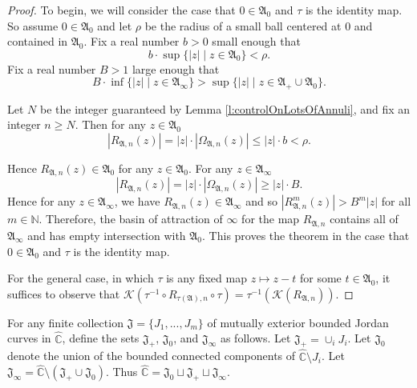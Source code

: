 \documentclass[a4paper,11pt,onecolumn]{amsart}
\theoremstyle{definition}
\begin{document}
  \begin{proof}
  To begin, we will consider the case that $0 \in \mathfrak{A}_0$ and $\tau$ is the identity map.  So assume $0 \in \mathfrak{A}_0$ and let $\rho$ be the radius of a small ball centered at $0$ and contained in $\mathfrak{A}_0$.  Fix a real number $b > 0$ small enough that 
  $$b \cdot \sup \{|z| \mid z \in \mathfrak{A}_0\} < \rho.$$  Fix a real number $B > 1$ large enough that 
  $$B \cdot \inf \{|z| \mid z \in \mathfrak{A}_{\infty}\} > \sup\{|z| \mid z \in \mathfrak{A}_+ \cup \mathfrak{A}_0\}.$$
  
  Let $N$ be the integer guaranteed by Lemma \ref{l:controlOnLotsOfAnnuli}, and fix an integer $n \geq N$.  Then for any $z \in \mathfrak{A}_0$
  $$|R_{\mathfrak{A},n}(z)| = |z| \cdot | \Omega_{\mathfrak{A},n}(z)| \leq |z| \cdot b < \rho.$$
  
  
    Hence $R_{\mathfrak{A},n}(z) \in \mathfrak{A}_0$ for any $z \in \mathfrak{A}_0$. 
  For any $z \in \mathfrak{A}_{\infty}$ 
  $$ |R_{\mathfrak{A},n}(z)| = |z| \cdot |\Omega_{\mathfrak{A},n}(z)| \geq |z| \cdot B.$$  Hence for any $z \in \mathfrak{A}_{\infty}$, we have $R_{\mathfrak{A},n}(z) \in \mathfrak{A}_{\infty}$ and so $|R^m_{\mathfrak{A},n}(z) | > B^m |z|$ for all $m \in \mathbb{N}$. 
  Therefore, the basin of attraction of $\infty$ for the map $R_{\mathfrak{A},n}$ contains all of $\mathfrak{A}_{\infty}$ and has empty intersection with $\mathfrak{A}_0$.  This proves the theorem in the case that $0 \in \mathfrak{A}_0$ and $\tau$ is the identity map. 
  
  For the general case, in which $\tau$ is any fixed map $z \mapsto z-t$ for some $t \in \mathfrak{A}_0$, it suffices to observe that $\mathcal{K}(\tau^{-1} \circ R_{\tau(\mathfrak{A}),n} \circ \tau) = \tau^{-1}(\mathcal{K}(R_{\mathfrak{A},n}))$.
  \end{proof}
  
  For any finite collection $\mathfrak{J}=\{J_1,...,J_m\}$ of mutually exterior bounded Jordan curves in $\hat{\mathbb{C}}$, define the sets $\mathfrak{J}_+$, $\mathfrak{J}_0$, and $\mathfrak{J}_{\infty}$ as follows.  Let $\mathfrak{J}_+ = \cup_i J_i$.  Let $\mathfrak{J}_0$ denote the union of the bounded connected components of $\hat{\mathbb{C}}\setminus J_i$.  Let $\mathfrak{J}_{\infty} = \hat{\mathbb{C}} \setminus (\mathfrak{J}_+ \cup \mathfrak{J}_0)$.  Thus $\hat{\mathbb{C}} = \mathfrak{J}_0 \sqcup \mathfrak{J}_+ \sqcup \mathfrak{J}_{\infty}$. 
  
\end{document}
